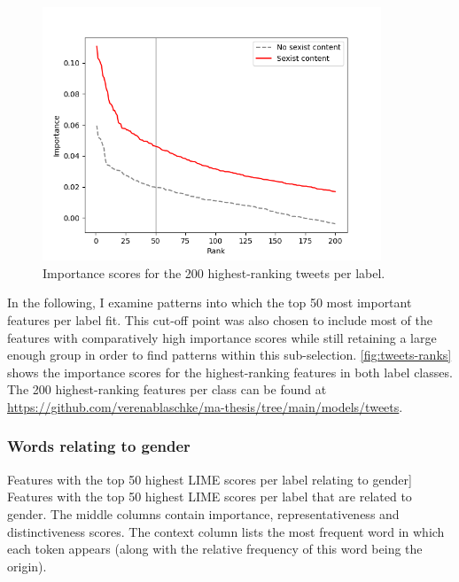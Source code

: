 \begin{figure}[htbp]
    \centering
    \includegraphics[width=0.9\textwidth]{figures/4-tweets/importance-rank-all-mean-unscaled-50.png}
    \caption[Importance scores for the 200 highest-ranking tweets per label]{Importance scores for the 200 highest-ranking tweets per label.}
    \label{fig:tweets-ranks}
\end{figure}

In the following, I examine patterns into which the top 50 most important features per label fit.
This cut-off point was also chosen to include most of the features with comparatively high importance scores while still retaining a large enough group in order to find patterns within this sub-selection.
\autoref{fig:tweets-ranks} shows the importance scores for the highest-ranking features in both label classes.
The 200 highest-ranking features per class can be found at \url{https://github.com/verenablaschke/ma-thesis/tree/main/models/tweets}.


\subsubsection{Words relating to gender}

\begin{table}[htbp]
    
    \caption
    [Features with the top 50 highest LIME scores per label relating to gender]
    {Features with the top 50 highest LIME scores per label that are related to gender.
    The middle columns contain importance, representativeness and distinctiveness scores.
    The context column lists the most frequent word in which each token appears (along with the relative frequency of this word being the origin).
    }
    \label{tab:gender-words}
\end{table}

